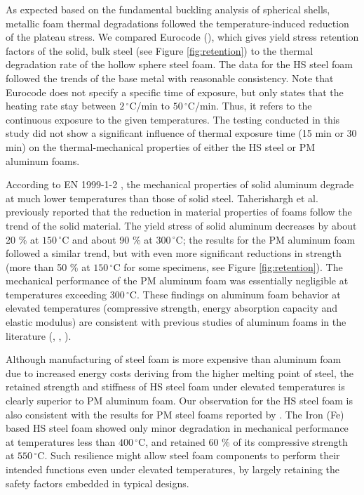 \documentclass[review]{elsarticle}
\begin{document}
As expected based on the fundamental buckling analysis of spherical shells, metallic foam thermal degradations followed the temperature-induced reduction of the plateau stress. We compared Eurocode (\cite{EC3-1-2}), which gives yield stress retention factors of the solid, bulk steel (see Figure \ref{fig:retention}) to the thermal degradation rate of the hollow sphere steel foam. The data for the HS steel foam followed the trends of the base metal with reasonable consistency. Note that Eurocode does not specify a specific time of exposure, but only states that the heating rate stay between  $2\,^{\circ}\mathrm{C}$/min to  $50\,^{\circ}\mathrm{C}$/min. Thus, it refers to the continuous exposure to the given temperatures. The testing conducted in this study did not show a significant influence of thermal exposure time (15 min or 30 min) on the thermal-mechanical properties of either the HS steel or PM aluminum foams. 

According to EN 1999-1-2 \cite{EC9-1-2}, the mechanical properties of solid aluminum degrade at much lower temperatures than those of solid steel. Taherishargh et al. \cite{Taherishargh2018} previously reported that the reduction in material properties of foams follow the trend of the solid material. The yield stress of solid aluminum decreases by about 20 \% at $150\,^{\circ}\mathrm{C}$ and about 90 \% at $300\,^{\circ}\mathrm{C}$; the results for the PM aluminum foam followed a similar trend, but with even more significant reductions in strength (more than 50 \% at $150\,^{\circ}\mathrm{C}$ for some specimens, see Figure  \ref{fig:retention}). The mechanical performance of the PM aluminum foam was essentially negligible at temperatures exceeding $300\,^{\circ}\mathrm{C}$. These findings on aluminum foam behavior at elevated temperatures (compressive strength, energy absorption capacity and elastic modulus) are consistent with previous studies of aluminum foams in the literature (\cite{Aly2007}, \cite{Kovacicetal2016}, \cite{Liuetal2016}).

Although manufacturing of steel foam is more expensive than aluminum foam due to increased energy costs deriving from the higher melting point of steel, the retained strength and stiffness of HS steel foam under elevated temperatures is clearly superior to PM aluminum foam. Our observation for the HS steel foam is also consistent with the results for PM steel foams reported by \cite{BekozOktay2014}. The Iron (Fe) based HS steel foam showed only minor degradation in mechanical performance at temperatures less than $400\,^{\circ}\mathrm{C}$, and retained 60 \% of its compressive strength at $550\,^{\circ}\mathrm{C}$. Such resilience might allow steel foam components to perform their intended functions even under elevated temperatures, by largely retaining the safety factors embedded in typical designs.
\end{document}
